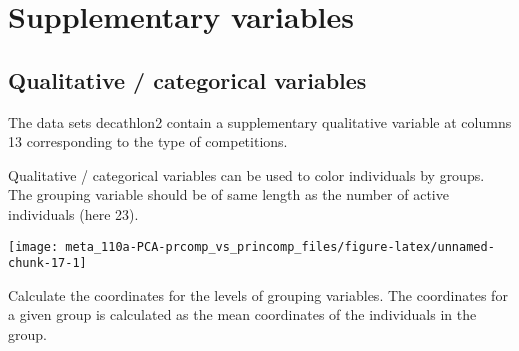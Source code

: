 \documentclass[]{book}
\newenvironment{Shaded}{\begin{snugshade}}{\end{snugshade}}
\newcommand{\CommentTok}[1]{\textcolor[rgb]{0.56,0.35,0.01}{\textit{#1}}}
\newcommand{\DataTypeTok}[1]{\textcolor[rgb]{0.13,0.29,0.53}{#1}}
\newcommand{\DecValTok}[1]{\textcolor[rgb]{0.00,0.00,0.81}{#1}}
\newcommand{\KeywordTok}[1]{\textcolor[rgb]{0.13,0.29,0.53}{\textbf{#1}}}
\newcommand{\NormalTok}[1]{#1}
\newcommand{\OperatorTok}[1]{\textcolor[rgb]{0.81,0.36,0.00}{\textbf{#1}}}
\newcommand{\OtherTok}[1]{\textcolor[rgb]{0.56,0.35,0.01}{#1}}
\newcommand{\StringTok}[1]{\textcolor[rgb]{0.31,0.60,0.02}{#1}}
\begin{document}
\hypertarget{supplementary-variables}{%
\section{Supplementary variables}\label{supplementary-variables}}

\hypertarget{qualitative-categorical-variables}{%
\subsection{Qualitative / categorical variables}\label{qualitative-categorical-variables}}

The data sets decathlon2 contain a supplementary qualitative variable at columns 13 corresponding to the type of competitions.

Qualitative / categorical variables can be used to color individuals by groups. The grouping variable should be of same length as the number of active individuals (here 23).

\begin{Shaded}
\end{Shaded}

\begin{center}\texttt{[image: meta\_110a-PCA-prcomp\_vs\_princomp\_files/figure-latex/unnamed-chunk-17-1]} \end{center}

Calculate the coordinates for the levels of grouping variables. The coordinates for a given group is calculated as the mean coordinates of the individuals in the group.
\end{document}
